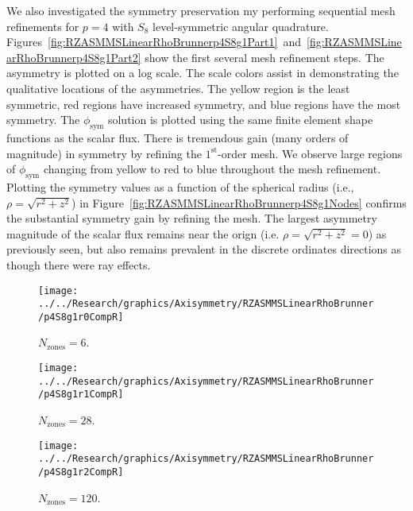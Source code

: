 \documentclass[12pt]{article}
\begin{document}
\FloatBarrier

We also investigated the symmetry preservation my performing sequential mesh refinements for $p=4$ with $S_8$ level-symmetric angular quadrature. Figures~\ref{fig:RZASMMSLinearRhoBrunnerp4S8g1Part1}~and~\ref{fig:RZASMMSLinearRhoBrunnerp4S8g1Part2} show the first several mesh refinement steps. The asymmetry is plotted on a log scale. The scale colors assist in demonstrating the qualitative locations of the asymmetries. The yellow region is the least symmetric, red regions have increased symmetry, and blue regions have the most symmetry. The $\phi_\text{sym}$ solution is plotted using the same finite element shape functions as the scalar flux. There is tremendous gain (many orders of magnitude) in symmetry by refining the $1^\text{st}$-order mesh. We observe large regions of $\phi_\text{sym}$ changing from yellow to red to blue throughout the mesh refinement. Plotting the symmetry values as a function of the spherical radius (i.e., $\rho=\sqrt{r^2+z^2}$) in Figure~\ref{fig:RZASMMSLinearRhoBrunnerp4S8g1Nodes} confirms the substantial symmetry gain by refining the mesh. The largest asymmetry magnitude of the scalar flux remains near the orign (i.e. $\rho=\sqrt{r^2+z^2}=0$) as previously seen, but also remains prevalent in the discrete ordinates directions as though there were ray effects.

\begin{sidewaysfigure}[!htb]
\centering
\begin{subfigure}{0.33\textwidth}
\texttt{[image: ../../Research/graphics/Axisymmetry/RZASMMSLinearRhoBrunner/p4S8g1r0CompR]}
\caption{$N_\text{zones}=6$.}
\end{subfigure}%
\begin{subfigure}{0.33\textwidth}
\texttt{[image: ../../Research/graphics/Axisymmetry/RZASMMSLinearRhoBrunner/p4S8g1r1CompR]}
\caption{$N_\text{zones}=28$.}
\end{subfigure}%
\begin{subfigure}{0.33\textwidth}
\texttt{[image: ../../Research/graphics/Axisymmetry/RZASMMSLinearRhoBrunner/p4S8g1r2CompR]}
\caption{$N_\text{zones}=120$.}
\end{subfigure}
\caption{Relative asymmetry for $p=4$ finite elements on a $1^\text{st}$-order mesh for $S_8$ level-symmetric angular quadrature for $N_\text{zones}=\{6,28,120\}$.}
\label{fig:RZASMMSLinearRhoBrunnerp4S8g1Part1}
\end{sidewaysfigure}
\end{document}
